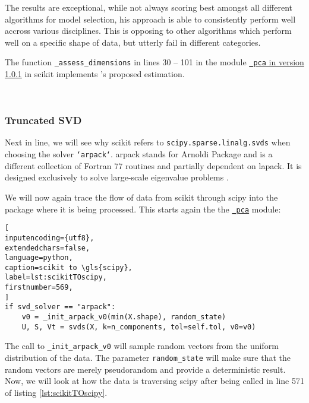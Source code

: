 The results are exceptional, while not always scoring best amongst all different algorithms for model selection, his approach is able to consistently perform well accross various disciplines.
This is opposing to other algorithms which perform well on a specific shape of data, but utterly fail in different categories.



\bigskip
The function \texttt{\_assess\_dimensions} in lines 30 -- 101 in the module \href{\scikitPCAvIxOxI{_pca}}{\texttt{\_pca} in version 1.0.1} in \gls{scikit} implements \citeauthor{minka2000automatic}'s proposed estimation.



\ \clearpage


\subsubsection{Truncated SVD}

Next in line, we will see why \gls{scikit} refers to \texttt{scipy.sparse.linalg.svds} when choosing the solver \texttt{`arpack`}. 
\acrshort{arpack} stands for Arnoldi Package and is a different collection of Fortran 77 routines and partially dependent on \acrshort{lapack}.
It is designed exclusively to solve large-scale eigenvalue problems \cite{lehoucq1998arpack}.
\medskip


We will now again trace the flow of data from \gls{scikit} through \gls{scipy} into the package where it is being processed.
This starts again the the \href{\scikitPCAvIxOxI{_pca}}{\texttt{\_pca}} module:

\begin{lstlisting}[
inputencoding={utf8}, 
extendedchars=false, 
language=python, 
caption=scikit to \gls{scipy}, 
label=lst:scikitTOscipy,
firstnumber=569,
]
if svd_solver == "arpack":
    v0 = _init_arpack_v0(min(X.shape), random_state)
    U, S, Vt = svds(X, k=n_components, tol=self.tol, v0=v0)
\end{lstlisting}

\noindent
The call to \texttt{\_init\_arpack\_v0} will sample random vectors from the uniform distribution of the data.
The parameter \texttt{random\_state} will make sure that the random vectors are merely pseudorandom and provide a deterministic result.
Now, we will look at how the data is traversing \gls{scipy} after being called in line 571 of listing \ref{lst:scikitTOscipy}.
\bigskip

